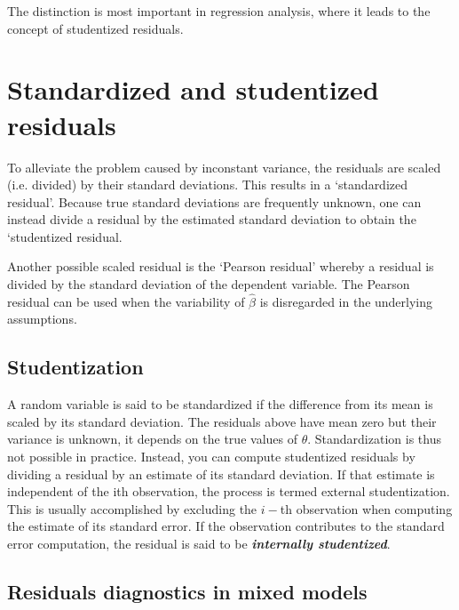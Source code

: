 \documentclass[Main.tex]{subfiles}
\begin{document}
The distinction is most important in regression analysis, where it leads to the concept of studentized residuals.

\newpage

\section{Standardized and studentized residuals} %
To alleviate the problem caused by inconstant variance, the residuals are scaled (i.e. divided) by their standard deviations. This results in a `standardized residual'. Because true standard deviations are frequently unknown, one can instead divide a residual by the estimated standard deviation to obtain the `studentized residual. 

Another possible scaled residual is the  `Pearson residual' whereby a residual is divided by the standard deviation of the dependent variable. The Pearson residual can be used when the variability of $\hat{\beta}$ is disregarded in the underlying assumptions.

\subsection{Studentization} %

A random variable is said to be standardized if the difference from its mean is scaled by its standard
deviation. The residuals above have mean zero but their variance is unknown, it depends on the true values
of $\theta$. Standardization is thus not possible in practice.
Instead, you can compute studentized residuals
by dividing a residual by an estimate of its standard deviation. If that estimate is independent of the ith
observation, the process is termed external studentization.
This is usually accomplished by excluding the
$i-$th observation when computing the estimate of its standard error. If the observation contributes to the
standard error computation, the residual is said to be \textbf{\emph{internally studentized}}.
\newpage
\subsection{Residuals diagnostics in mixed models}
\end{document}
